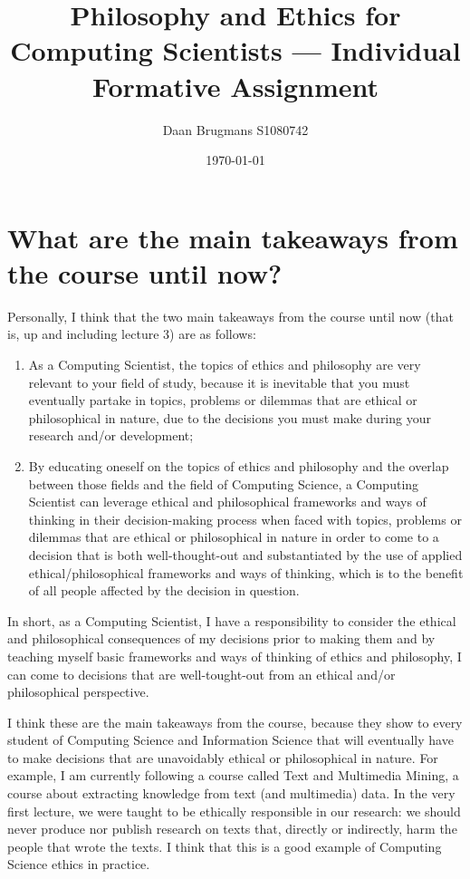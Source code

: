 \documentclass{IEEEtran}
\title{Philosophy and Ethics for Computing Scientists --- Individual Formative Assignment}
\author{Daan Brugmans S1080742}
\date{\today}
\begin{document}
\maketitle

\section*{What are the main takeaways from the course until now?}
Personally, I think that the two main takeaways from the course until now (that is, up and including lecture 3) are as follows:
\begin{enumerate}
    \item As a Computing Scientist, the topics of ethics and philosophy are very relevant to your field of study, because it is inevitable that you must eventually partake in topics, problems or dilemmas that are ethical or philosophical in nature, due to the decisions you must make during your research and/or development;
    \item By educating oneself on the topics of ethics and philosophy and the overlap between those fields and the field of Computing Science, a Computing Scientist can leverage ethical and philosophical frameworks and ways of thinking in their decision-making process when faced with topics, problems or dilemmas that are ethical or philosophical in nature in order to come to a decision that is both well-thought-out and substantiated by the use of applied ethical/philosophical frameworks and ways of thinking, which is to the benefit of all people affected by the decision in question.
\end{enumerate}

In short, as a Computing Scientist, I have a responsibility to consider the ethical and philosophical consequences of my decisions prior to making them 
and by teaching myself basic frameworks and ways of thinking of ethics and philosophy, I can come to decisions that are well-tought-out from an ethical and/or philosophical perspective.

I think these are the main takeaways from the course, because they show to every student of Computing Science and Information Science that will eventually have to make decisions that are unavoidably ethical or philosophical in nature.
For example, I am currently following a course called Text and Multimedia Mining, a course about extracting knowledge from text (and multimedia) data.
In the very first lecture, we were taught to be ethically responsible in our research: 
we should never produce nor publish research on texts that, directly or indirectly, harm the people that wrote the texts.
I think that this is a good example of Computing Science ethics in practice.
\end{document}
